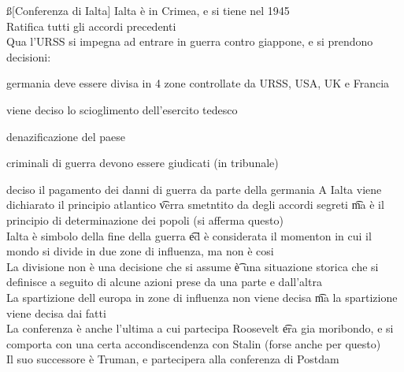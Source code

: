 \documentclass[12pt]{article}
\begin{document}
\ss[Conferenza di Ialta]
Ialta è in Crimea, e si tiene nel 1945 \\
Ratifica tutti gli accordi precedenti \\
Qua l'URSS si impegna ad entrare in guerra contro giappone, e si prendono decisioni:
\bi
  \item germania deve essere divisa in 4 zone controllate da URSS, USA, UK e Francia
  \item viene deciso lo scioglimento dell'esercito tedesco
  \item denazificazione del paese
  \item criminali di guerra devono essere giudicati (in tribunale)
  \item deciso il pagamento dei danni di guerra da parte della germania
\ei
A Ialta viene dichiarato il principio atlantico \t verra smetntito da degli accordi segreti \t ma è il principio di determinazione dei popoli (si afferma questo) \\
Ialta è simbolo della fine della guerra \t ed è considerata il momenton in cui il mondo si divide in due zone di influenza, ma non è cosi \\
La divisione non è una decisione che si assume \t è una situazione storica che si definisce a seguito di alcune azioni prese da una parte e dall'altra \\
La spartizione dell europa in zone di influenza non viene decisa \t ma la spartizione viene decisa dai fatti \\
La conferenza è anche l'ultima a cui partecipa Roosevelt \t era gia moribondo, e si comporta con una certa accondiscendenza con Stalin (forse anche per questo) \\
Il suo successore è Truman, e partecipera alla conferenza di Postdam
\end{document}
